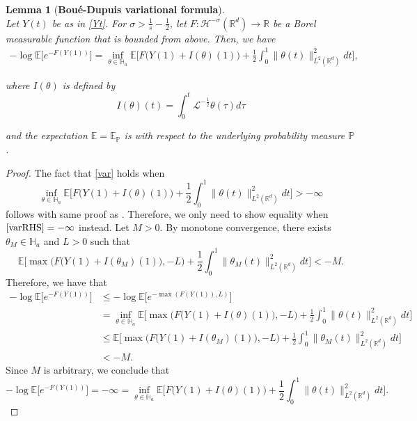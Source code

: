 \documentclass[%
11pt,  reqno]{amsart}
\newtheorem{lemma}[theorem]{Lemma}
\theoremstyle{remarkstyle}
\newcommand{\1}{\hspace{0.2mm}\text{I}\hspace{0.2mm}}
\newcommand{\noi}{\noindent}
\newcommand{\R}{\mathbb{R}}
\newcommand{\E}{\mathbb{E}}
\renewcommand{\L}{\mathcal{L}}
\newcommand{\s}{\sigma}
\newcommand{\ta}{\theta}
\renewcommand{\H}{\mathcal{H}}
\numberwithin{equation}{section}
\numberwithin{theorem}{section}
\begin{document}
	\begin{lemma} [\bf Bou\'e-Dupuis variational formula]  
		\label{LEM:var} \mbox{}\\
		Let $Y(t)$ be as in \eqref{Yt}. For $\s > \frac1s - \frac12$, let $F: \H^{-\s} (\R^d) \to \R$ be a Borel measurable function that is bounded from above. Then, we have
		\begin{align}
			\label{var}
			-\log \E \Big[ e^{-F(Y(1))} \Big] = \inf_{\theta \in \mathbb{H}_a} \E
			\bigg[F\big(Y(1) + I(\theta) (1) \big) + \frac12 \int_0^1 \| \theta (t) \|_{L^2(\R^d)}^2 dt\bigg],
		\end{align}
		
		
		\noi
		where $I (\theta)$ is defined by
		\[
		I (\theta) (t) = \int_0^t \L^{-\frac12} \theta (\tau) d\tau
		\]
		
		\noi
		and
		the expectation $\E = \E_{\mathbb P}$ is with respect to the underlying probability measure $\mathbb P$.
	\end{lemma}
	\begin{proof}
		The fact that \eqref{var} holds when 
		\begin{equation}\label{varRHS}
			\inf_{\theta \in \mathbb{H}_a} \E
			\bigg[F\big(Y(1) + I(\theta) (1) \big) + \frac12 \int_0^1 \| \theta (t) \|_{L^2(\R^d)}^2 dt\bigg] > -\infty
		\end{equation}
		follows with same proof as \cite[Proposition A.2]{TW23}. Therefore, we only need to show equality when $\eqref{varRHS} = - \infty$ instead. Let $M > 0$. By monotone convergence, there exists $\ta_M \in \mathbb{H}_a$ and $L >0$ such that 
		\begin{equation*}
			\E
			\bigg[\max\Big(F\big(Y(1) + I(\theta_M) (1) \big), -L\Big)  + \frac12 \int_0^1 \| \theta_M (t) \|_{L^2(\R^d)}^2 dt\bigg] < -M.
		\end{equation*}
		Therefore, we have that 
		\begin{align*}
			-\log \E \Big[ e^{-F(Y(1))} \Big] &\le -\log \E \Big[ e^{-\max(F(Y(1)),L)} \Big] \\
			& = \inf_{\theta \in \mathbb{H}_a} \E
			\bigg[\max\Big(F\big(Y(1) + I(\theta) (1) \big), -L\Big) + \frac12 \int_0^1 \| \theta (t) \|_{L^2(\R^d)}^2 dt\bigg] \\
			& \le \E
			\bigg[\max\Big(F\big(Y(1) + I(\theta_M) (1) \big), -L\Big)  + \frac12 \int_0^1 \| \theta_M (t) \|_{L^2(\R^d)}^2 dt\bigg] \\
			& < - M.
		\end{align*}
		Since $M$ is arbitrary, we conclude that 
		\begin{equation*}
			-\log \E \Big[ e^{-F(Y(1))} \Big] = -\infty = \inf_{\theta \in \mathbb{H}_a} \E
			\bigg[F\big(Y(1) + I(\theta) (1) \big) + \frac12 \int_0^1 \| \theta (t) \|_{L^2(\R^d)}^2 dt\bigg].
		\end{equation*}
	\end{proof}
\end{document}
